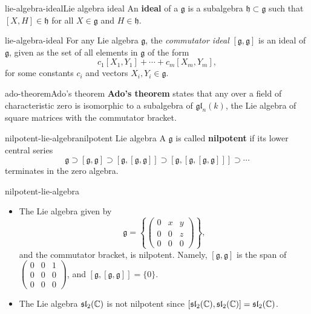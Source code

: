\begin{topic}{lie-algebra-ideal}{Lie algebra ideal}
    An \textbf{ideal} of a  $\mathfrak{g}$ is a subalgebra $\mathfrak{h} \subset \mathfrak{g}$ such that $[X, H] \in \mathfrak{h}$ for all $X \in \mathfrak{g}$ and $H \in \mathfrak{h}$.
\end{topic}

\begin{example}{lie-algebra-ideal}
    For any Lie algebra $\mathfrak{g}$, the \textit{commutator ideal} $[\mathfrak{g}, \mathfrak{g}]$ is an ideal of $\mathfrak{g}$, given as the set of all elements in $\mathfrak{g}$ of the form
    \[ c_1 [X_1, Y_1] + \cdots + c_m [X_m, Y_m] , \]
    for some constants $c_i$ and vectors $X_i, Y_i \in \mathfrak{g}$.
\end{example}

\begin{topic}{ado-theorem}{Ado's theorem}
    \textbf{Ado's theorem} states that any  over a field of characteristic zero is isomorphic to a subalgebra of $\mathfrak{gl}_n(k)$, the Lie algebra of square matrices with the commutator bracket.
\end{topic}

\begin{topic}{nilpotent-lie-algebra}{nilpotent Lie algebra}
    A  $\mathfrak{g}$ is called \textbf{nilpotent} if its lower central series
    \[ \mathfrak{g} \supset [\mathfrak{g}, \mathfrak{g}] \supset [\mathfrak{g}, [\mathfrak{g}, \mathfrak{g}]] \supset [\mathfrak{g}, [\mathfrak{g}, [\mathfrak{g}, \mathfrak{g}]]] \supset \cdots \]
    terminates in the zero algebra.
\end{topic}

\begin{example}{nilpotent-lie-algebra}
    \begin{itemize}
        \item The Lie algebra given by
        \[ \mathfrak{g} = \left\{ \begin{pmatrix} 0 & x & y \\ 0 & 0 & z \\ 0 & 0 & 0 \end{pmatrix} \right\} , \]
        and the commutator bracket, is nilpotent. Namely, $[\mathfrak{g}, \mathfrak{g}]$ is the span of $\begin{pmatrix} 0 & 0 & 1 \\ 0 & 0 & 0 \\ 0 & 0 & 0 \end{pmatrix}$, and $[\mathfrak{g}, [\mathfrak{g}, \mathfrak{g}]] = \{ 0 \}$.
        
        \item The Lie algebra $\mathfrak{sl}_2(\mathbb{C})$ is not nilpotent since $[\mathfrak{sl}_2(\mathbb{C}), \mathfrak{sl}_2(\mathbb{C})] = \mathfrak{sl}_2(\mathbb{C})$.
    \end{itemize}
\end{example}

